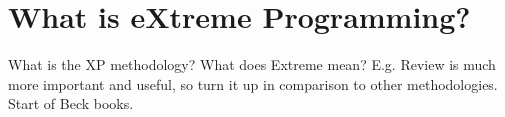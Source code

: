 \section{What is eXtreme Programming?}
What is the XP methodology?
What does Extreme mean? E.g. Review is much more important and useful, so turn it up in comparison to other methodologies.
Start of Beck books.